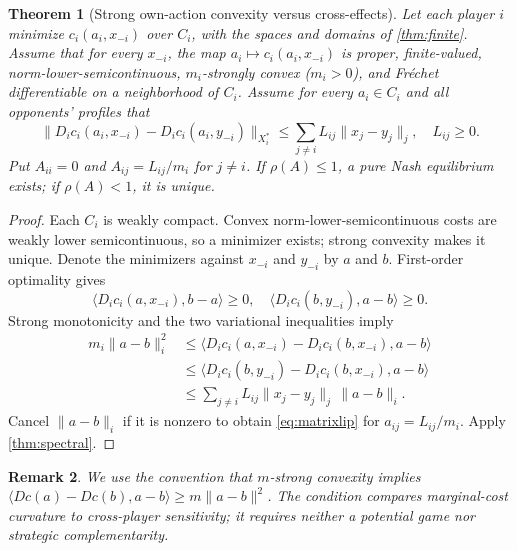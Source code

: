 \documentclass[11pt]{article}
\newtheorem{theorem}{Theorem}[section]
\newtheorem{remark}[theorem]{Remark}
\theoremstyle{definition}\newtheorem{definition}[theorem]{Definition}
\begin{document}
\begin{theorem}[Strong own-action convexity versus cross-effects\label{thm:primitives}]
Let each player $i$ minimize $c_i(a_i,x_{-i})$ over $C_i$, with the spaces and domains of \cref{thm:finite}. Assume that for every $x_{-i}$, the map $a_i\mapsto c_i(a_i,x_{-i})$ is proper, finite-valued, norm-lower-semicontinuous, $m_i$-strongly convex ($m_i>0$), and Fr\'echet differentiable on a neighborhood of $C_i$. Assume for every $a_i\in C_i$ and all opponents' profiles that
\[\|D_i c_i(a_i,x_{-i})-D_i c_i(a_i,y_{-i})\|_{X_i^*}
\le\sum_{j\ne i}L_{ij}\|x_j-y_j\|_j,\quad L_{ij}\ge0.\]
Put $A_{ii}=0$ and $A_{ij}=L_{ij}/m_i$ for $j\ne i$. If $\rho(A)\le1$, a pure Nash equilibrium exists; if $\rho(A)<1$, it is unique.
\end{theorem}
\begin{proof}
Each $C_i$ is weakly compact. Convex norm-lower-semicontinuous costs are weakly lower semicontinuous, so a minimizer exists; strong convexity makes it unique. Denote the minimizers against $x_{-i}$ and $y_{-i}$ by $a$ and $b$. First-order optimality gives
\[\langle D_ic_i(a,x_{-i}),b-a\rangle\ge0,\quad
\langle D_ic_i(b,y_{-i}),a-b\rangle\ge0.\]
Strong monotonicity and the two variational inequalities imply
\begin{align*}
m_i\|a-b\|_i^2
&\le\langle D_ic_i(a,x_{-i})-D_ic_i(b,x_{-i}),a-b\rangle\\
&\le\langle D_ic_i(b,y_{-i})-D_ic_i(b,x_{-i}),a-b\rangle\\
&\le\sum_{j\ne i}L_{ij}\|x_j-y_j\|_j\,\|a-b\|_i.
\end{align*}
Cancel $\|a-b\|_i$ if it is nonzero to obtain \eqref{eq:matrixlip} for $a_{ij}=L_{ij}/m_i$. Apply \cref{thm:spectral}.
\end{proof}
\begin{remark}
We use the convention that $m$-strong convexity implies $\langle Dc(a)-Dc(b),a-b\rangle\ge m\|a-b\|^2$. The condition compares marginal-cost curvature to cross-player sensitivity; it requires neither a potential game nor strategic complementarity.
\end{remark}
\end{document}

